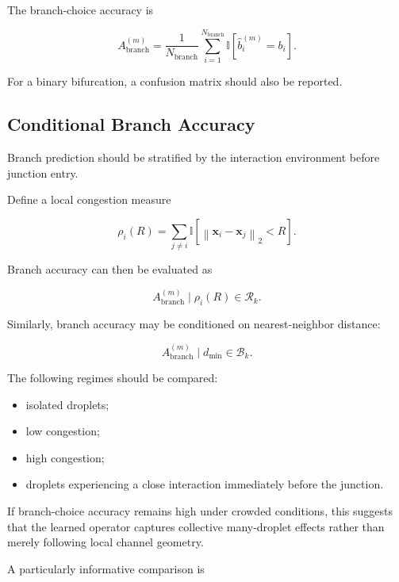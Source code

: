 \documentclass[11pt]{article}
\newcommand{\x}{\mathbf{x}}
\begin{document}
The branch-choice accuracy is

\begin{equation}
A_{\mathrm{branch}}^{(m)}
=
\frac{1}{N_{\mathrm{branch}}}
\sum_{i=1}^{N_{\mathrm{branch}}}
\mathbb{I}
\left[
\hat{b}_i^{(m)}
=
b_i
\right].
\end{equation}

For a binary bifurcation, a confusion matrix should also be reported.

\subsection{Conditional Branch Accuracy}

Branch prediction should be stratified by the interaction environment before junction entry.

Define a local congestion measure

\begin{equation}
\rho_i(R)
=
\sum_{j\neq i}
\mathbb{I}
\left[
\left\|
\x_i-\x_j
\right\|_2
<
R
\right].
\end{equation}

Branch accuracy can then be evaluated as

\begin{equation}
A_{\mathrm{branch}}^{(m)}
\mid
\rho_i(R)\in\mathcal{R}_k.
\end{equation}

Similarly, branch accuracy may be conditioned on nearest-neighbor distance:

\begin{equation}
A_{\mathrm{branch}}^{(m)}
\mid
d_{\min}\in\mathcal{B}_k.
\end{equation}

The following regimes should be compared:

\begin{itemize}
    \item isolated droplets;
    \item low congestion;
    \item high congestion;
    \item droplets experiencing a close interaction immediately before the junction.
\end{itemize}

If branch-choice accuracy remains high under crowded conditions, this suggests that the learned operator captures collective many-droplet effects rather than merely following local channel geometry.

A particularly informative comparison is
\end{document}
